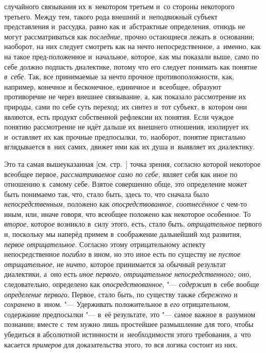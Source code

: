 случайного связывания их в~некотором третьем и~со стороны некоторого
третьего. Между тем, такого рода внешний и~неподвижный субъект
представления и~рассудка, равно как и~абстрактные определения, отнюдь не
могут рассматриваться как {\em последние,} прочно
остающиеся лежать в~основании; наоборот, на них следует
смотреть как на нечто непосредственное, а~именно, как на такое
пред-положенное и~начальное, которое, как мы показали выше, само по себе
должно подпасть диалектике, потому что его следует понимать как понятие
{\em в~себе}. Так, все
принимаемые за нечто прочное противоположности, как, например, конечное и
бесконечное, единичное и~всеобщее, образуют противоречие не через внешнее
связывание, а, как показало рассмотрение их природы, сами по себе суть
переход; их синтез и~тот субъект, в~котором они являются, есть продукт
собственной рефлексии их понятия. Если чуждое понятию рассмотрение не идёт
дальше их внешнего отношения, изолирует их и~оставляет их как прочные
предпосылки, то, наоборот, понятие пристально вглядывается в~них самих,
движет ими как их душа и~выявляет их диалектику.

Это та самая вышеуказанная [см. стр.~\pageref{bkm:bmpg224a}]
точка зрения, согласно которой некоторое всеобщее первое,
{\em рассматриваемое} {\em само по себе,} являет
себя как иное по отношению к~самому себе. Взятое совершенно обще, это
определение может быть понимаемо так, что, стало быть, здесь то, что
сначала было {\em непосредственным,}
положено как {\em опосредствованное, соотнесённое} с
чем-то иным, или, иначе говоря, что всеобщее положено как некоторое
особенное. То {\em второе,}
которое возникло в~силу этого, есть, стало быть, {\em отрицательное}
первого и, поскольку мы наперёд примем в~соображение
дальнейший ход развития, {\em первое
отрицательное}. Согласно этому отрицательному аспекту
непосредственное {\em погибло}
в ином, но это иное есть по существу не
{\em пустое отрицательное,} не {\em ничто,}
которое принимается за обычный результат диалектики, а~оно
есть {\em иное первого,}
{\em отрицательное непосредственного;} оно, следовательно, определено как
{\em опосредствованное,} "--- {\em содержит} в~себе
вообще {\em определение первого}. Первое, стало быть, по существу также
{\em сбережено} и {\em сохранено} в~ином. "--- Удерживать положительное в
{\em его} отрицательном, содержание предпосылки "--- в~её
результате,
это "--- самое важное в~разумном познании; вместе
с~тем нужно лишь простейшее размышление для того, чтобы убедиться в
абсолютной истинности и~необходимости этого требования, а~что касается
{\em примеров} для доказательства этого, то вся логика состоит из них.

